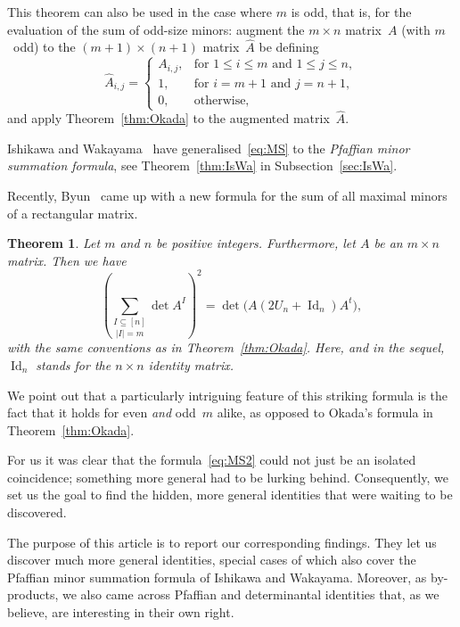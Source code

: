 \documentclass[12pt,reqno]{amsart}
\numberwithin{equation}{section}
\newtheorem{theorem}{Theorem}
\theoremstyle{definition}
\theoremstyle{remark}
\def\Id{\operatorname{Id}}
\begin{document}
This theorem can also be used in the case where $m$ is odd, that is,
for the evaluation of the sum of odd-size minors: augment the
$m\times n$ matrix~$A$ (with $m$~odd) to the $(m+1)\times(n+1)$
matrix~$\hat A$ be defining
$$
\hat A_{i,j}=\begin{cases}
A_{i,j},&\text{for $1\le i\le m$ and $1\le j\le n$},\\
1,&\text{for $i=m+1$ and $j=n+1$},\\
0,&\text{otherwise,}
\end{cases}
$$
and apply Theorem~\ref{thm:Okada} to the augmented matrix~$\hat A$.

Ishikawa and Wakayama~\cite{IsWaAA} have generalised~\eqref{eq:MS}
to the {\it Pfaffian minor summation formula}, see
Theorem~\ref{thm:IsWa} in Subsection~\ref{sec:IsWa}.

Recently, Byun~\cite[Theorem~1.3]{ByunAA} came up with a new
formula for the sum of all maximal minors of a rectangular matrix.

\begin{theorem} \label{thm:Byun}
Let $m$ and $n$ be positive integers.
Furthermore, let $A$ be an $m\times n$ matrix. Then we have
\begin{equation} \label{eq:MS2} 
\left(\underset{|I|=m}{\sum_{I\subseteq[n]}}
 \det A^I\right)^2
 =
\det\bigl(A(2U_n+\Id_n)A^t\bigr),
\end{equation}
with the same conventions as in Theorem~\ref{thm:Okada}.
Here, and in the sequel, $\Id_n$ stands for the $n\times n$ identity
matrix.
\end{theorem}

We point out that a particularly intriguing feature of this
striking formula is the fact that it holds for even {\it and\/}
odd~$m$ alike, as opposed to Okada's formula in
Theorem~\ref{thm:Okada}.

For us it was clear that the formula~\eqref{eq:MS2} could not just
be an isolated coincidence; something more general had to be lurking
behind. Consequently, we set us the goal to find the hidden, more
general identities that were waiting to be discovered.

\medskip
The purpose of this article is to report our corresponding findings.
They let us discover much more general identities, special cases of
which also cover the Pfaffian minor summation formula of Ishikawa
and Wakayama. Moreover, as by-products, we also came across
Pfaffian and determinantal identities that, as we believe, are
interesting in their own right.
\end{document}
